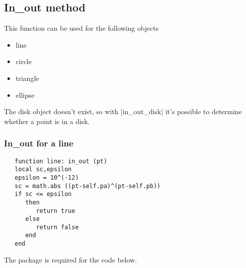 
\subsection{In\_out method} %
\label{sub:in_out_method}

This function can be used for the following objects
\begin{itemize}
   \item line
   \item circle 
   \item triangle
   \item ellipse
\end{itemize}
 The disk object doesn't exist, so with |in\_out\_disk| it's possible to determine whether a point is in a disk.

\subsubsection{In\_out for a line} %
\label{ssub:in_out_for_a_line}

\begin{mybox}
   \begin{verbatim}
   function line: in_out (pt)
   local sc,epsilon
   epsilon = 10^(-12)
   sc = math.abs ((pt-self.pa)^(pt-self.pb))
   if sc <= epsilon
      then 
         return true
      else 
         return false 
      end
   end \end{verbatim}
\end{mybox}

The  package is required for the code below.

